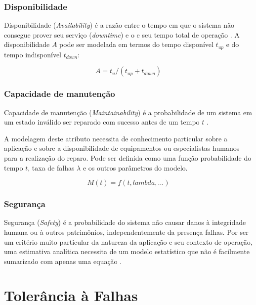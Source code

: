 \subsubsection{Disponibilidade}

Disponibilidade (\textit{Availability}) é a razão entre o tempo em que o sistema não consegue prover seu serviço (\textit{downtime}) e o e seu tempo total de operação \cite{FaultInjectionTechniques}. A disponibilidade $A$ pode ser modelada em termos do tempo disponível $t_{up}$ e do tempo indisponível $t_{down}$:

\begin{equation}
    A = t_u / (t_{up} + t_{down})
\end{equation}

\subsubsection{Capacidade de manutenção}

Capacidade de manutenção (\textit{Maintainability}) é a probabilidade de um sistema em um estado inválido ser reparado com sucesso antes de um tempo $t$ \cite{FaultInjectionTechniques}.

A modelagem deste atributo necessita de conhecimento particular sobre a aplicação e sobre a disponibilidade de equipamentos ou especialistas humanos para a realização do reparo. Pode ser definida como uma função probabilidade do tempo $t$, taxa de falhas $\lambda$ e os outros parâmetros do modelo.

\begin{equation}
    M(t) = f(t, lambda, ...)
\end{equation}

\subsubsection{Segurança}

Segurança (\textit{Safety}) é a probabilidade do sistema não causar danos à integridade humana ou à outros patrimônios, independentemente da presença falhas. Por ser um critério muito particular da natureza da aplicação e seu contexto de operação, uma estimativa analítica necessita de um modelo estatístico que não é facilmente sumarizado com apenas uma equação \cite{FaultInjectionTechniques}.






\section{Tolerância à Falhas}

